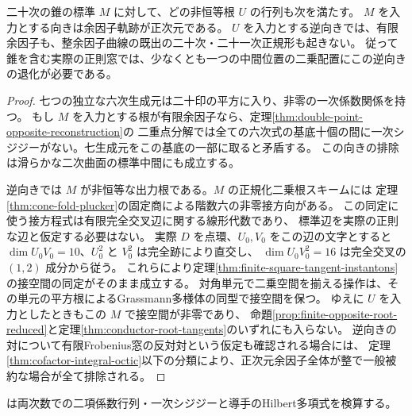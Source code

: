 \begin{corollary}\label{cor:cone-middle-two-sided-excess}
二十次の錐の標準 $M$ に対して、どの非恒等根 $U$ の行列も次を満たす。
$M$ を入力とする向きは余因子軌跡が正次元である。
$U$ を入力とする逆向きでは、有限余因子も、整余因子曲線の既出の二十次・二十一次正規形も起きない。
従って錐を含む実際の正則窓では、少なくとも一つの中間位置の二乗配置にこの逆向きの退化が必要である。
\end{corollary}
\begin{proof}
七つの独立な六次生成元は二十印の平方に入り、非零の一次係数関係を持つ。
もし $M$ を入力とする根が有限余因子なら、定理\ref{thm:double-point-opposite-reconstruction}の
二重点分解では全ての六次式の基底十個の間に一次シジジーがない。七生成元をこの基底の一部に取ると矛盾する。
この向きの排除は滑らかな二次曲面の標準中間にも成立する。

逆向きでは $M$ が非恒等な出力根である。$M$ の正規化二乗根スキームには
定理\ref{thm:cone-fold-plucker}の固定商による階数六の非零接方向がある。
この同定に使う接方程式は有限完全交叉辺に関する線形代数であり、
標準辺を実際の正則な辺と仮定する必要はない。
実際 $D$ を点環、$U_0,V_0$ をこの辺の文字とすると
$\dim U_0V_0=10$、$U_0^2$ と $V_0^2$ は完全跡により直交し、
$\dim U_0V_0^2=16$ は完全交叉の $(1,2)$ 成分から従う。
これらにより定理\ref{thm:finite-square-tangent-instantons}の接空間の同定がそのまま成立する。
対角単元で二乗空間を揃える操作は、その単元の平方根によるGrassmann多様体の同型で接空間を保つ。
ゆえに $U$ を入力としたときもこの $M$ で接空間が非零であり、
命題\ref{prop:finite-opposite-root-reduced}と定理\ref{thm:conductor-root-tangents}のいずれにも入らない。
逆向きの対について有限Frobenius窓の反対対という仮定も確認される場合には、
定理\ref{thm:cofactor-integral-octic}以下の分類により、正次元余因子全体が整で一般被約な場合が全て排除される。
\end{proof}
 は両次数での二項係数行列・一次シジジーと導手のHilbert多項式を検算する。
